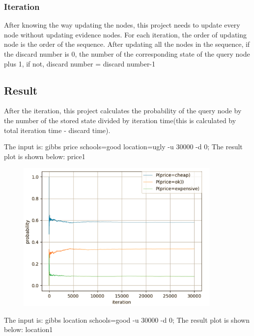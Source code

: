 \documentclass[11pt, a4paper]{article}
\begin{document}
\subsubsection{Iteration}

After knowing the way updating the nodes, this project needs to update every node without updating evidence nodes. 
For each iteration, the order of updating node is the order of the sequence. After updating all the nodes in the sequence, if the discard number is 0, the number of the corresponding state of the query node plus 1, if not, discard number = discard number-1


\subsection{Result}

After the iteration, this project calculates the probability of the query node by the number of the stored state divided by iteration time(this is calculated by total iteration time - discard time).

The input is: gibbs price schools=good location=ugly -u 30000 -d 0; The result plot is shown below: price1

\begin{figure}[htbp]
	
	\centering 
	\includegraphics[width=10cm]{gs_1}
	
	\label{fig:gb1}
	
\end{figure}

The input is: gibbs location schools=good -u 30000 -d 0; The result plot is shown below: location1
\end{document}

